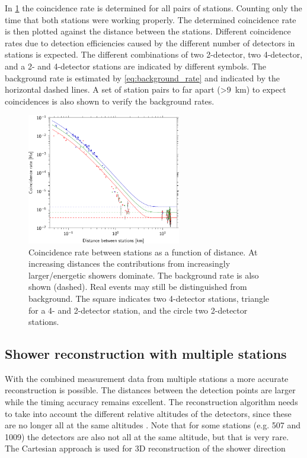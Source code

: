 In \cref{fig:distance_v_coincidence_rate} the coincidence rate is determined for all pairs of stations. Counting only the time that both stations were working properly. The determined coincidence rate is then plotted against the distance between the stations. Different coincidence rates due to detection efficiencies caused by the different number of detectors in stations is expected. The different combinations of two 2-detector, two 4-detector, and a 2- and 4-detector stations are indicated by different symbols. The background rate is estimated by \cref{eq:background_rate} and indicated by the horizontal dashed lines. A set of station pairs to far apart (\SI{>9}{\kilo\meter}) to expect coincidences is also shown to verify the background rates.

\begin{figure}
    \centering
    \includegraphics[width=0.6\textwidth]
                    {plots/cluster/distance_v_coincidence_rate}
    \caption{Coincidence rate between stations as a function of distance. At increasing distances the contributions from increasingly larger/energetic showers dominate. The background rate is also shown (dashed). Real events may still be distinguished from background. The square indicates two 4-detector stations, triangle for a 4- and 2-detector station, and the circle two 2-detector stations.}
    \label{fig:distance_v_coincidence_rate}
\end{figure}

\subsection{Shower reconstruction with multiple stations}

With the combined measurement data from multiple stations a more accurate reconstruction is possible. The distances between the detection points are larger while the timing accuracy remains excellent. The reconstruction algorithm needs to take into account the different relative altitudes of the detectors, since these are no longer all at the same altitudes \cite{steijger2012direction}. Note that for some stations (e.g. 507 and 1009) the detectors are also not all at the same altitude, but that is very rare. The Cartesian approach is used for 3D reconstruction of the shower direction \cite{montanus2015direction}

